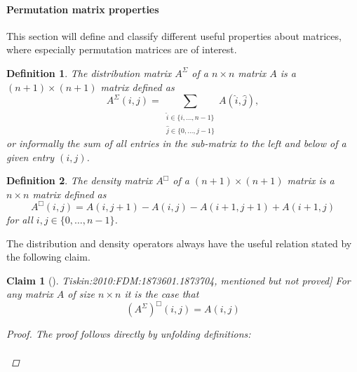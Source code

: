 \documentclass[twoside,11pt,openright]{report}
\newcommand{\reftiskin}[2]{\cite[#1]{Tiskin:2010:FDM:1873601.1873704}, #2}
\newtheorem{mydef}{Definition}
\newtheorem{claim}{Claim}
\begin{document}
\paragraph{Permutation matrix properties}
This section will define and classify different useful properties about matrices, where especially permutation matrices are of interest. 
%
\begin{mydef}
  The distribution matrix $A^{\Sigma}$ of a $n \times n$ matrix $A$ is a $(n + 1) \times (n + 1)$ matrix defined as
  \[
    A^{\Sigma}(i, j) = \sum_{\substack{\hat{i} \in \{i, \dots, n - 1\} \\ \hat{j} \in \{0, \dots, j - 1\}}} {A(\hat{i}, \hat{j})},
  \]
  or informally the sum of all entries in the sub-matrix to the left and below of a given entry $(i, j)$.
\end{mydef}
%
\begin{mydef}
  The density matrix $A^{\Box}$ of a $(n + 1) \times (n + 1)$ matrix is a $n \times n$ matrix defined as
  \[
    A^{\Box}(i, j) = A(i, j + 1) - A(i, j) - A(i + 1, j + 1) + A(i + 1, j)
  \]
  for all $i, j \in \{ 0, \dots, n - 1 \}$.
\end{mydef}%
The distribution and density operators always have the useful relation stated by the following claim.
\begin{claim}[\reftiskin{p. 1288}{mentioned but not proved}]
  \label{claim:sigma-box-identity}
  For any matrix $A$ of size $n \times n$ it is the case that
  \[
    (A^{\Sigma})^{\Box}(i, j) = A(i, j)
  \]
  \begin{proof}
    The proof follows directly by unfolding definitions:\\
    \\
  \end{proof}
\end{claim}
\end{document}

